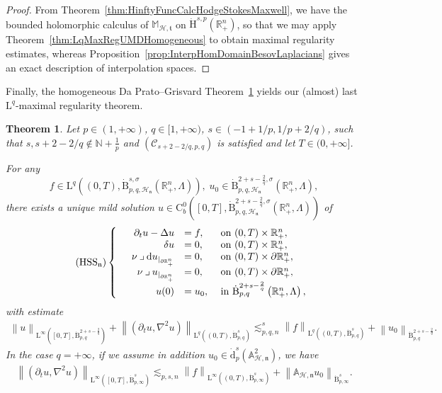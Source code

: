 \documentclass[10pt]{amsart}
\newtheorem{theo}{Theorem}[section]
\theoremstyle{definition}\newtheorem{defi}[theo]{Definition}\newtheorem{rema}[theo]{Remark}\newtheorem{exam}[theo]{Example}\newtheorem{exem}[theo]{Example}\newtheorem{nota}[theo]{Notation}
\newcommand{\bbA}{\mathbb{A}}
\newcommand{\bbR}{\mathbb{R}}
\newcommand{\bbN}{\mathbb{N}}
\newcommand{\bbM}{\mathbb{M}}
\newcommand{\rmH}{\mathrm{H}}%
\newcommand{\rmB}{\mathrm{B}}
\newcommand{\rmd}{\mathrm{d}}
\newcommand{\rmL}{\mathrm{L}}
\newcommand{\rmC}{\mathrm{C}}
\newcommand{\clH}{\mathcal{H}}
\newcommand{\clC}{\mathcal{C}}
\newcommand{\fkn}{\mathfrak{n}}
\newcommand{\fkt}{\mathfrak{t}}
\newcommand{\iprod}{\mathbin{\lrcorner}}
\begin{document}
\begin{proof}
From Theorem~\ref{thm:HinftyFuncCalcHodgeStokesMaxwell}, we have the bounded holomorphic calculus of $\bbM_\mathcal{H,\fkt}$ on $\dot{\rmH}^{s,p}(\bbR^n_+)$, so that we may apply Theorem~\ref{thm:LqMaxRegUMDHomogeneous} to obtain maximal regularity estimates, whereas Proposition~\ref{prop:InterpHomDomainBesovLaplacians} gives an exact description of interpolation spaces.
\end{proof}

Finally, the homogeneous Da Prato--Grisvard Theorem~\ref{thm:MaxRxBesovHodgeStokesRn+} yields our (almost) last $\rmL^q$-maximal regularity theorem.


\begin{theo}\label{thm:MaxRxBesovHodgeStokesRn+}
Let $p\in(1,+\infty)$, $q\in[1,+\infty)$, $s\in(-1+1/p,1/p+2/q)$, such that $s,s+2-2/q\notin \bbN +\frac{1}{p}$ and $(\clC_{s+2-2/q,p,q})$ is satisfied and let $T\in(0,+\infty]$.

For any 
\[
f\in \rmL^q\left((0,T),\dot{\rmB}^{s,\sigma}_{p,q,\mathcal{\clH_{\fkn}}}\left(\bbR^n_+,\Lambda\right)\right), \; u_0\in \dot{\rmB}^{2+s-\frac{2}{q},\sigma}_{p,q,\clH_\fkn}\left(\bbR^n_+,\Lambda\right),
\]
there exists a unique mild solution $u \in \rmC ^0_b([0,T],\dot{\rmB}^{2+s-\frac{2}{q},\sigma}_{p,q,\clH_\fkn}(\bbR^n_+,\Lambda))$ of
\begin{equation}
\tag{HSS${}_{\fkn}$}\label{eq:HodgeStokesAbsoluteBCSystem}
\left\{
\begin{array}{rrll}
&{\partial_t u - \Delta u}  &{= f,} &{\text{ on } (0,T)\times\bbR^n_+,}\\
&{\delta u} &{=  0,} &{\text{ on } (0,T)\times\bbR^n_+,}\\
&{\nu\iprod\rmd u_{|_{\partial\bbR^n_+}}} &{=  0,}
&{\text{ on } (0,T)\times\partial\bbR^n_+,}\\
&{\nu\iprod u_{|_{\partial\bbR^n_+}}} &{=  0,}
&{\text{ on } (0,T)\times\partial\bbR^n_+,}\\
&{u(0)} &{=  u_0,}
&{\text{ in } \dot{\rmB}^{2+s-\frac{2}{q}}_{p,q}\left(\bbR^n_+,\Lambda\right),}
\end{array}\right.
\end{equation}
with estimate
\begin{align*}
\left\| u \right\|_{\rmL^\infty([0,T],\dot{\rmB}^{2+s-\frac{2}{q}}_{p,q})} + 
\left\| \left(\partial_t u, \nabla^2 u\right) \right\|_{\rmL^q\left((0,T),\dot{\rmB}^{s}_{p,q}\right)} \lesssim_{p,q,n}^{s} \left\| f \right\|_{\rmL^q\left((0,T),\dot{\rmB}^{s}_{p,q}\right)} + \left\| u_0 \right\|_{\dot{\rmB}^{2+s-\frac{2}{q}}_{p,q}}.
\end{align*}
In the case $q=+\infty$, if we assume in addition $u_0\in \dot{\rmd}^{s}_{p}(\bbA_{\clH,\fkn}^2)$, we have
\begin{align*}
\left\| \left(\partial_t u, \nabla^2 u\right)\right\|_{\rmL^\infty\left([0,T],\dot{\rmB}^{s}_{p,\infty}\right)} \lesssim_{p,s,n} \left\| f \right\|_{\rmL^\infty\left((0,T),\dot{\rmB}^{s}_{p,\infty}\right)} + \left\| \bbA_{\clH,\fkn} u_0 \right\|_{\dot{\rmB}^{s}_{p,\infty}}.
\end{align*}
\end{theo}
\end{document}
